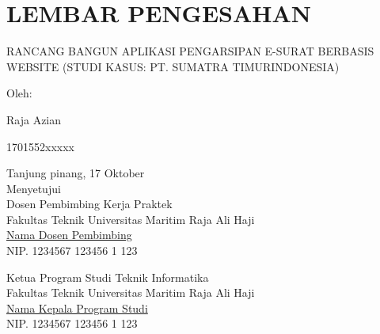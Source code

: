 \chapter*{\centering LEMBAR PENGESAHAN}

\thispagestyle{empty}


\begin{center}
    RANCANG BANGUN APLIKASI PENGARSIPAN E-SURAT BERBASIS WEBSITE (STUDI KASUS: PT. SUMATRA TIMURINDONESIA)
\end{center}

\vspace{1cm}

\begin{center}
    Oleh:
    \begin{multicols}{2}
        {Raja Azian}

        {1701552xxxxx}
    \end{multicols}

    \vspace{1cm}

    Tanjung pinang, 17 Oktober \the\year{}\\
    Menyetujui\\
    Dosen Pembimbing Kerja Praktek \\
    Fakultas Teknik Universitas Maritim Raja Ali Haji \\
    \vspace{2cm}
    \underline{ Nama Dosen Pembimbing } \\
    NIP. 1234567 123456 1 123 \\

    \vspace{2.75cm}

    Ketua Program Studi Teknik Informatika \\
    Fakultas Teknik Universitas Maritim Raja Ali Haji \\
    \vspace{2cm}
    \underline{ Nama Kepala Program Studi } \\
    NIP. 1234567 123456 1 123 \\
\end{center}